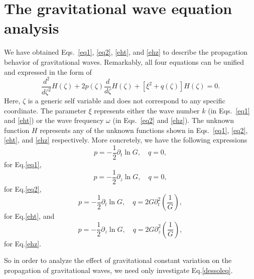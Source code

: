 \documentclass[prd,aps,a4paper,superscriptaddress,onecolumn,nofootinbib]{revtex4}
\begin{document}
\section{The gravitational wave equation analysis}\label{sec4}
We have obtained Eqs.~\eqref{eq1}, \eqref{eq2}, \eqref{eht}, and \eqref{ehz} to describe the propagation behavior of gravitational waves.
Remarkably, all four equations can be unified and expressed in the form of
\begin{equation}
    \frac{d^2}{d\zeta^2}H(\zeta)+2p(\zeta)\frac{d}{d\zeta}H(\zeta)+\left[\xi^2+q(\zeta)\right]H(\zeta)=0.\label{dessoleq}
\end{equation}
Here, $\zeta$ is a generic self variable and does not correspond to any specific coordinate.
The parameter $\xi$ represents either the wave number $k$ (in Eqs.~\eqref{eq1} and \eqref{eht}) or the wave frequency $\omega$ (in Eqs.~\eqref{eq2} and \eqref{ehz}).
The unknown function $H$ represents any of the unknown functions shown in Eqs.~\eqref{eq1}, \eqref{eq2}, \eqref{eht}, and \eqref{ehz} respectively.
More concretely, we have the following expressions
\begin{equation}
p=-\frac{1}{2}\partial_t \ln G,\quad q=0,\label{eq3}
\end{equation}
for Eq.\eqref{eq1},
\begin{equation}
p=-\frac{1}{2}\partial_z \ln G,\quad q=0,\label{eq4}
\end{equation}
for Eq.\eqref{eq2},
\begin{equation}
p=-\frac{1}{2}\partial_t \ln G,\quad q=2G\partial_t^2\left(\frac{1}{G}\right),\label{eq6}
\end{equation}
for Eq.\eqref{eht}, and
\begin{equation}
    p=-\frac{1}{2}\partial_z \ln G,\quad q=2G\partial_z^2 \left(\frac{1}{G}\right),\label{eq7}
\end{equation}
for Eq.\eqref{ehz}.

So in order to analyze the effect of gravitational constant variation on the propagation of gravitational waves, we need only investigate Eq.\eqref{dessoleq}.
\end{document}
